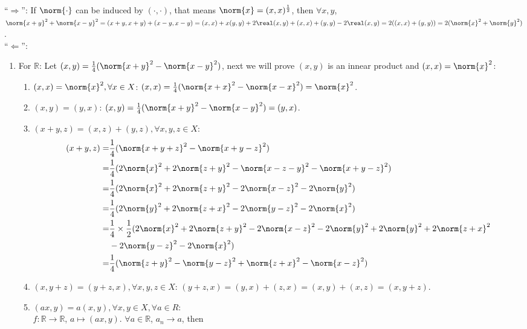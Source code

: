 \documentclass{ctexart}
\begin{document}
\begin{solution}
    ``$\Rightarrow$'': If $\norm{\cdot}$ can be induced by $(\cdot,\cdot)$, that means $\norm{x}=(x,x)^{\frac{1}{2}}$, then $\forall x, y$, $\norm{x+y}^2+\norm{x-y}^2=(x+y,x+y)+(x-y,x-y)=(x,x)+x(y,y)+2\real(x,y)+(x,x)+(y,y)-2\real(x,y)=2((x,x)+(y,y))=2(\norm{x}^2+\norm{y}^2)$.\\
    ``$\Leftarrow$'': \begin{enumerate}
        \item\label{it:01} For $\mathbb{R}$: Let $(x,y)=\frac{1}{4}(\norm{x+y}^2-\norm{x-y}^2)$, next we will prove $(x,y)$ is an innear product and $(x,x)=\norm{x}^2$:
        \begin{enumerate}
            \item\label{it:1} $(x,x)=\norm{x}^2, \forall x\in X$: $(x,x)=\frac{1}{4}(\norm{x+x}^2-\norm{x-x}^2)=\norm{x}^2$.
            \item\label{it:2} $(x,y)=(y,x)$: $(x,y)=\frac{1}{4}(\norm{x+y}^2-\norm{x-y}^2)=(y,x)$.
            \item\label{it:3} $(x+y,z)=(x,z)+(y,z),\forall x,y,z\in X$:
            \begin{equation}
                \begin{aligned}
                    (x+y,z)=&\frac{1}{4}(\norm{x+y+z}^2-\norm{x+y-z}^2)\\
                    =&\frac{1}{4}(2\norm{x}^2+2\norm{z+y}^2-\norm{x-z-y}^2-\norm{x+y-z}^2)\\
                    =&\frac{1}{4}(2\norm{x}^2+2\norm{z+y}^2-2\norm{x-z}^2-2\norm{y}^2)\\
                    =&\frac{1}{4}(2\norm{y}^2+2\norm{z+x}^2-2\norm{y-z}^2-2\norm{x}^2)\\
                    =&\frac{1}{4}\times\frac{1}{2}(2\norm{x}^2+2\norm{z+y}^2-2\norm{x-z}^2-2\norm{y}^2+2\norm{y}^2+2\norm{z+x}^2\\
                    &-2\norm{y-z}^2-2\norm{x}^2)\\
                    =&\frac{1}{4}(\norm{z+y}^2-\norm{y-z}^2+\norm{z+x}^2-\norm{x-z}^2)
                \end{aligned}
            \end{equation}
            \item\label{it:4} $(x,y+z)=(y+z,x),\forall x,y,z\in X$: $(y+z,x)=(y,x)+(z,x)=(x,y)+(x,z)=(x,y+z)$.
            \item\label{it:5} $(ax,y)=a(x,y),\forall x,y\in X,\forall a\in R$:\\
            $f:\mathbb{R}\to \mathbb{R}$, $a\mapsto (ax,y)$. $\forall a\in \mathbb{R}$, $a_n\to a$, then 

\end{enumerate}
\end{enumerate}
\end{solution}
\end{document}
